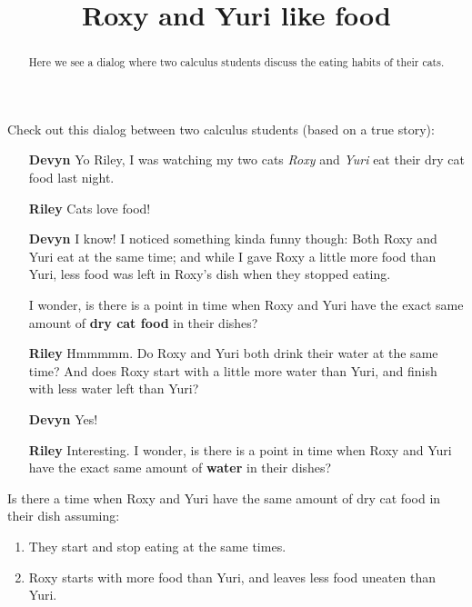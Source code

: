 \documentclass{ximera}
\title[Break-Ground:]{Roxy and Yuri like food}
\begin{document}
\begin{abstract}
Here we see a dialog where two calculus students discuss the eating
habits of their cats.
\end{abstract}
\maketitle

Check out this dialog between two calculus students (based on a true
story):

\begin{itemize}
  \item[\textbf{Devyn}] Yo Riley, I was watching my two cats
    \textit{Roxy} and \textit{Yuri} eat their dry cat food last night.
\item[\textbf{Riley}] Cats love food!
\item[\textbf{Devyn}] I know! I noticed something kinda funny though:
  Both Roxy and Yuri eat at the same time; and while I gave Roxy a
  little more food than Yuri, less food was left in Roxy's dish when
  they stopped eating.

  I wonder, is there is a point in time when Roxy and Yuri have the
  exact same amount of \textbf{dry cat food} in their dishes?
\item[\textbf{Riley}] Hmmmmm. Do Roxy and Yuri both drink their water
  at the same time?  And does Roxy start with a little more water than
  Yuri, and finish with less water left than Yuri?
  \item[\textbf{Devyn}] Yes!
\item[\textbf{Riley}] Interesting. I wonder, is there is a point in
  time when Roxy and Yuri have the exact same amount of \textbf{water}
  in their dishes?
\end{itemize}

\begin{problem}
  Is there a time when Roxy and Yuri have the same amount of dry cat
  food in their dish assuming:
  \begin{enumerate}
  \item They start and stop eating at the same times.
  \item Roxy starts with more food than Yuri, and leaves less food uneaten than Yuri. 
  \end{enumerate}
  \begin{multipleChoice}
  \end{multipleChoice}
\end{problem}
\end{document}
